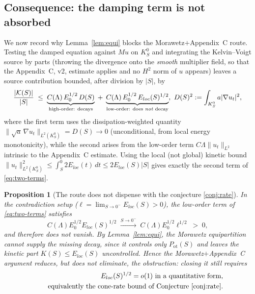 \documentclass[11pt,letterpaper]{amsart}
\newtheorem{proposition}[theorem]{Proposition}
\begin{document}
\subsection{Consequence: the damping term is not absorbed}

We now record why Lemma~\ref{lem:equi} blocks the Morawetz$+$Appendix~C route. Testing the damped
equation against $Mu$ on $K_S^0$ and integrating the Kelvin--Voigt source by parts (throwing the
divergence onto the \emph{smooth} multiplier field, so that the Appendix~C, v2, estimate applies
and no $H^2$ norm of $u$ appears) leaves a source contribution bounded, after division by $|S|$,
by
\begin{equation}\label{eq:two-terms}
\frac{|\mathcal K(S)|}{|S|} \;\le\; \underbrace{C(\Lambda)\,E_0^{1/2}\,D(S)}_{\text{high-order: decays}}
\;+\; \underbrace{C(\Lambda)\,E_0^{1/2}\,E_{loc}(S)^{1/2}}_{\text{low-order: does \emph{not} decay}},
~ D(S)^2:=\int_{K_S^0}a|\nabla u_t|^2,
\end{equation}
where the first term uses the dissipation-weighted quantity $\|\sqrt a\,\nabla u_t\|_{L^2(K_S^0)}=D(S)\to0$
(unconditional, from local energy monotonicity), while the second arises from the low-order term
$C\Lambda\|u_t\|_{L^2}$ intrinsic to the Appendix~C estimate. Using the local (not global)
kinetic bound $\|u_t\|_{L^2(K_S^0)}^2\le\int_S^0 2E_{loc}(t)\,dt\le 2E_{loc}(S)|S|$ gives exactly the
second term of \eqref{eq:two-terms}.

\begin{proposition}[The route does not dispense with the conjecture \ref{conj:rate}]\label{prop:noescape}
In the contradiction setup ($\ell=\lim_{S\to0^-}E_{loc}(S)>0$), the low-order term of
\eqref{eq:two-terms} satisfies
\[
C(\Lambda)E_0^{1/2}E_{loc}(S)^{1/2}\;\xrightarrow{S\to0^-}\;C(\Lambda)E_0^{1/2}\ell^{1/2}\;>\;0,
\]
and therefore does not vanish. By Lemma~\ref{lem:equi}, the Morawetz equipartition cannot supply
the missing decay, since it controls only $P_{\mathrm{ot}}(S)$ and leaves the kinetic part
$K(S)\le E_{loc}(S)$ uncontrolled. Hence the Morawetz$+$Appendix~C argument reduces, but does not
eliminate, the obstruction: closing it still requires
\begin{eqnarray}\label{eq:need}
&&E_{loc}(S)^{1/2}=o(1)\ \text{in a quantitative form}, \\
&& \quad ~\text{equivalently the cone-rate bound of Conjecture~\ref{conj:rate}.}\nonumber
\end{eqnarray}
\end{proposition}
\end{document}
